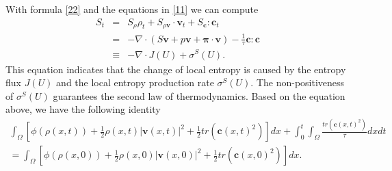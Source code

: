 \documentclass{article}
\theoremstyle{plain}
\begin{document}
With formula \eqref{22} and the equations in \eqref{11} we can compute
\begin{eqnarray}\label{23}
  S_t &=& S_{\rho} \rho_t + S_{\rho \mathbf{v}} \cdot \mathbf{v}_t + S_\mathbf{c} : \mathbf{c}_t \nonumber\\
  &=& -\nabla \cdot (S\mathbf{v}+p \mathbf{v}+ \mathbf{\pi} \cdot \mathbf{v}) - \frac{1}{\tau}\mathbf{c}:\mathbf{c} \\
  &\equiv& -\nabla \cdot J(U) + \sigma^S(U) .\nonumber
\end{eqnarray}
This equation indicates that the change of local entropy is caused by the entropy flux $J(U)$ and the local entropy production rate $\sigma^S(U)$. The non-positiveness of $\sigma^S(U)$ guarantees the second law of thermodynamics.
Based on the equation above, we have the following identity
\begin{multline*}
\int_\Omega \left[\phi(\rho(x,t))+\frac{1}{2}\rho(x,t)|{\mathbf{v}}(x,t)|^2+\frac{1}{2} tr(\mathbf{c}(x,t)^2)\right] dx +\int_0^t \int_\Omega \frac{tr(\mathbf{c}(x,t)^2)}{\tau} dx dt \\
= \int_\Omega \left[\phi(\rho(x,0))+\frac{1}{2}\rho(x,0)|{\mathbf{v}}(x,0)|^2+\frac{1}{2} tr(\mathbf{c}(x,0)^2)\right] dx .
\end{multline*}
\end{document}
